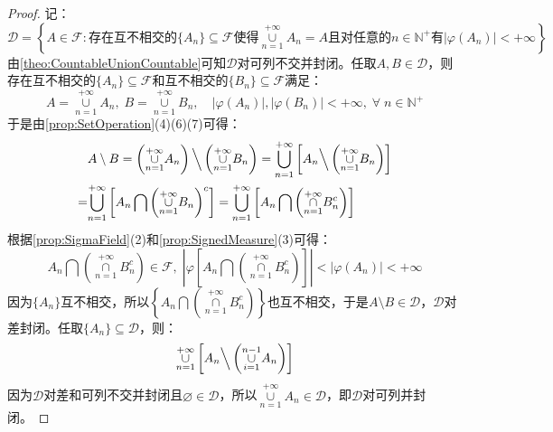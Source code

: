 \begin{proof}
	记：
	\begin{equation*}
		\mathscr{D}=\left\{A\in\mathscr{F}:\text{存在互不相交的}\{A_n\}\subseteq\mathscr{F}\text{使得}\underset{n=1}{\overset{+\infty}{\cup}}A_n=A\text{且对任意的}n\in\mathbb{N}^+\text{有}|\varphi(A_n)|<+\infty\right\}
	\end{equation*}
	由\cref{theo:CountableUnionCountable}可知$\mathscr{D}$对可列不交并封闭。任取$A,B\in\mathscr{D}$，则存在互不相交的$\{A_n\}\subseteq\mathscr{F}$和互不相交的$\{B_n\}\subseteq\mathscr{F}$满足：
	\begin{equation*}
		A=\underset{n=1}{\overset{+\infty}{\cup}}A_n,\; B=\underset{n=1}{\overset{+\infty}{\cup}}B_n,\quad|\varphi(A_n)|,|\varphi(B_n)|<+\infty,\;\forall\;n\in\mathbb{N}^+
	\end{equation*}
	于是由\cref{prop:SetOperation}(4)(6)(7)可得：
	\begin{align*}
		&A\setminus B=\left(\underset{n=1}{\overset{+\infty}{\cup}}A_n\right)\Big\backslash\left(\underset{n=1}{\overset{+\infty}{\cup}}B_n\right)=\underset{n=1}{\overset{+\infty}{\bigcup}}\left[A_n\Big\backslash\left(\underset{n=1}{\overset{+\infty}{\cup}}B_n\right)\right] \\
		=&\underset{n=1}{\overset{+\infty}{\bigcup}}\left[A_n\bigcap\left(\underset{n=1}{\overset{+\infty}{\cup}}B_n\right)^c\right]=\underset{n=1}{\overset{+\infty}{\bigcup}}\left[A_n\bigcap\left(\underset{n=1}{\overset{+\infty}{\cap}}B_n^c\right)\right]
	\end{align*}
	根据\cref{prop:SigmaField}(2)和\cref{prop:SignedMeasure}(3)可得：
	\begin{equation*}
		A_n\bigcap\left(\underset{n=1}{\overset{+\infty}{\cap}}B_n^c\right)\in\mathscr{F},\;\left\lvert\varphi\left[A_n\bigcap\left(\underset{n=1}{\overset{+\infty}{\cap}}B_n^c\right)\right]\right\rvert<|\varphi(A_n)|<+\infty
	\end{equation*}
	因为$\{A_n\}$互不相交，所以$\left\{A_n\bigcap\left(\underset{n=1}{\overset{+\infty}{\cap}}B_n^c\right)\right\}$也互不相交，于是$A\setminus B\in\mathscr{D}$，$\mathscr{D}$对差封闭。任取$\{A_n\}\subseteq\mathscr{D}$，则：
	\begin{equation*}
		\underset{n=1}{\overset{+\infty}{\cup}}\left[A_n\Big\backslash\left(\underset{i=1}{\overset{n-1}{\cup}}A_n\right)\right]
	\end{equation*}
	因为$\mathscr{D}$对差和可列不交并封闭且$\varnothing\in\mathscr{D}$，所以$\underset{n=1}{\overset{+\infty}{\cup}}A_n\in\mathscr{D}$，即$\mathscr{D}$对可列并封闭。\par

\end{proof}
